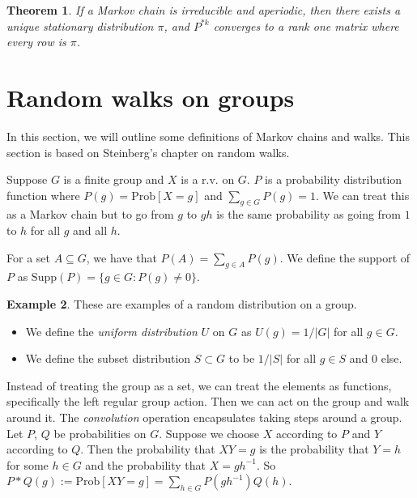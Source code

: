 \documentclass[]{article}
\newtheorem{theorem}{Theorem}
\theoremstyle{definition}
\newtheorem{example}[theorem]{Example}
\numberwithin{theorem}{section}
\numberwithin{equation}{section}
\newcommand{\supp}{\text{Supp}}
\begin{document}
\begin{theorem}
	If a Markov chain is irreducible and aperiodic, then there exists a unique stationary distribution $\pi$, and $P^{*k}$ converges to a rank one matrix where every row is $\pi$. 
\end{theorem}

\section{Random walks on groups}\label{sec:defns}
In this section, we will outline some definitions of Markov chains and walks. This section is based on Steinberg's chapter on random walks\cite{steinbergProbabilityRandomWalks2012}.

Suppose $G$ is a finite group and $X$ is a r.v. on $G$. $P$ is a probability distribution function where $P(g) = \text{Prob}[X = g]$ and $\sum_{g\in G} P(g) = 1$. We can treat this as a Markov chain but to go from $g$ to $gh$ is the same probability as going from $1$ to $h$ for all $g$ and all $h$. 

For a set $A \subseteq G$, we have that $P(A) = \sum_{g \in A} P(g)$. We define the support of $P$ as $\supp(P) = \lbrace g \in G : P(g) \neq 0 \rbrace$. 


\begin{example}
	These are examples of a random distribution on a group. 
	\begin{itemize}
		\item We define the \textit{uniform distribution} $U$ on $G$ as $U(g) = 1/|G|$ for all $g \in G$. 
		\item We define the subset distribution $S \subset G$ to be $1/|S|$ for all $ g \in S$ and 0 else.
	\end{itemize}
\end{example}

Instead of treating the group as a set, we can treat the elements as functions, specifically the left regular group action. Then we can act on the group and walk around it. The \textit{convolution} operation encapsulates taking steps around a group.
Let $P$, $Q$ be probabilities on $G$. Suppose we choose $X$ according to $P$ and $Y$ according to $Q$. Then the probability that $XY = g$ is the probability that $Y = h$ for some $h \in G$ and the probability that $X = gh^{-1}$. 
So $P \ast Q(g) := \text{Prob}[XY = g] = \sum_{h\in G} P(gh^{-1})Q(h) $.
\end{document}

